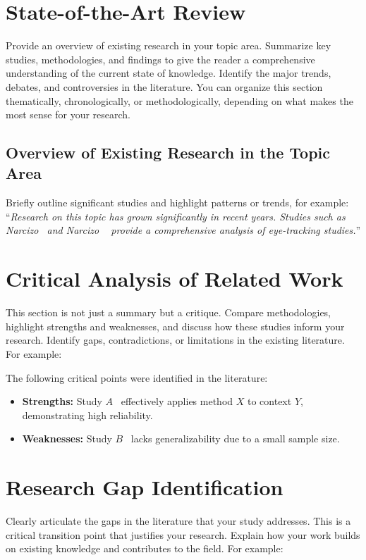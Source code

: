 \section{State-of-the-Art Review}\label{sec:state-of-the-art}
Provide an overview of existing research in your topic area. Summarize key studies, methodologies, and findings to give the reader a comprehensive understanding of the current state of knowledge. Identify the major trends, debates, and controversies in the literature. You can organize this section thematically, chronologically, or methodologically, depending on what makes the most sense for your research.

\subsection{Overview of Existing Research in the Topic Area}\label{subsec:overview}
Briefly outline significant studies and highlight patterns or trends, for example: ``\textit{Research on this topic has grown significantly in recent years. Studies such as Narcizo~\cite{Narcizo2013} and Narcizo \etal~\cite{Narcizo2013a} provide a comprehensive analysis of eye-tracking studies.}''

\section{Critical Analysis of Related Work}\label{sec:critical-analysis}
This section is not just a summary but a critique. Compare methodologies, highlight strengths and weaknesses, and discuss how these studies inform your research. Identify gaps, contradictions, or limitations in the existing literature. For example:

The following critical points were identified in the literature:
\begin{itemize}
    \item \textbf{Strengths:} Study $A$~\cite{Narcizo2015} effectively applies method $X$ to context $Y$, demonstrating high reliability.
    \item \textbf{Weaknesses:} Study $B$~\cite{Munzlinger2012} lacks generalizability due to a small sample size.
\end{itemize}

\section{Research Gap Identification}\label{sec:research-gap}
Clearly articulate the gaps in the literature that your study addresses. This is a critical transition point that justifies your research. Explain how your work builds on existing knowledge and contributes to the field. For example: 

